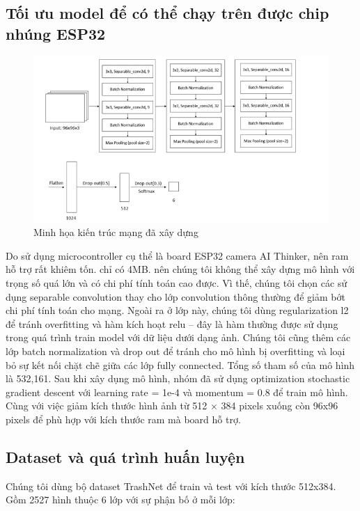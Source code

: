 \subsection{Tối ưu model để có thể chạy trên được chip nhúng ESP32}
\begin{figure}[ht]
    \centering
    \includegraphics[width=\linewidth]{images/Quanh/ktmang.png}
    \caption{Minh họa kiến trúc mạng đã xây dựng}
    \label{fig:kientrucmang}
\end{figure}

Do sử dụng microcontroller cụ thể là board ESP32 camera AI Thinker, nên ram hỗ trợ rất khiêm tốn. chỉ có 4MB. nên chúng tôi không thể xây dựng mô hình với trọng số quá lớn và có chi phí tính toán cao được. Vì thế, chúng tôi chọn các sử dụng separable convolution thay cho lớp convolution thông thường để giảm bớt chi phí tính toán cho mạng. Ngoài ra ở lớp này, chúng tôi dùng regularization l2 để tránh overfitting và hàm kích hoạt relu – đây là hàm thường được sử dụng trong quá trình train model với dữ liệu dưới dạng ảnh. Chúng tôi cũng thêm các lớp batch normalization và drop out để tránh cho mô hình bị overfitting và loại bỏ sự kết nối chặt chẽ giữa các lớp fully connected. Tổng số tham số của mô hình là 532,161. Sau khi xây dụng mô hình, nhóm đã sử dụng optimization stochastic gradient descent với learning rate = 1e-4 và momentum = 0.8 để train mô hình. Cùng với việc giảm kích thước hình ảnh từ 512 × 384 pixels xuống còn 96x96 pixels để phù hợp với kích thước ram mà board hỗ trợ.

\subsection{Dataset và quá trình huấn luyện} %
Chúng tôi dùng bộ dataset TrashNet \cite{trashnet} để train và test với kích thước 512x384.
Gồm 2527 hình thuộc 6 lớp với sự phận bố ở mỗi lớp:
 
